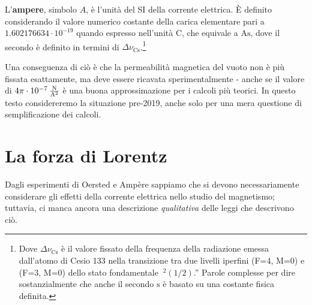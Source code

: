 \begin{define}[Ampere {(2019)}]
	L'\textbf{ampere}, simbolo $A$, è l'unità del SI della corrente elettrica. È definito considerando il valore numerico costante della carica elementare pari a $1.602176634\cdot10^{-19}$ quando espresso nell'unità $\unit{\coulomb}$, che equivale a $\unit{\ampere\second}$, dove il secondo è definito in termini di $\Delta \nu_{\textrm{Cs}}$.\footnote{Dove $\Delta \nu_{\textrm{Cs}}$ è il valore fissato della frequenza della radiazione emessa dall'atomo di Cesio 133 nella transizione tra due livelli iperfini (F=4, M=0) e (F=3, M=0) dello stato fondamentale $~^2(1/2)$.'' Parole complesse per dire sostanzialmente che anche il secondo $\unit{\second}$ è basato su una costante fisica definita.} 
\end{define}
Una conseguenza di ciò è che la permeabilità magnetica del vuoto non è più fissata esattamente, ma deve essere ricavata sperimentalmente - anche se il valore di $4\pi\cdot\SI[per-mode = fraction]{d-7}{\newton\per\ampere\squared}$ è una buona approssimazione per i calcoli più teorici. In questo testo considereremo la situazione pre-2019, anche solo per una mera questione di semplificazione dei calcoli.
\section{La forza di Lorentz}
Dagli esperimenti di Oersted e Ampère sappiamo che si devono necessariamente considerare gli effetti della corrente elettrica nello studio del magnetismo; tuttavia, ci manca ancora una descrizione \textit{qualitativa} delle leggi che descrivono ciò.

